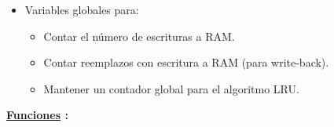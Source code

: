 \documentclass{article}
\begin{document}
\begin{itemize}
\begin{itemize}
        \item Variables globales para:

        \begin{itemize}
            \item Contar el número de escrituras a RAM.
            \item Contar reemplazos con escritura a RAM (para write-back).
            \item Mantener un contador global para el algoritmo LRU.
        \end{itemize}
        
    \end{itemize}    
    
   
\end{itemize}

\quad

\textbf{ \underline{Funciones} :}

\quad
\end{document}
